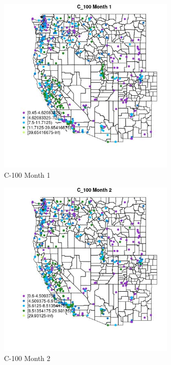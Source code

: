 \begin{figure} 
\centering  
\includegraphics[width=0.77\textwidth]{Code_Outputs/ML_input_report_ML_input_PM25_Step5_part_d_de_duplicated_aves_ML_input_MapObsMo1C_100.jpg} 
\caption{\label{fig:ML_input_report_ML_input_PM25_Step5_part_d_de_duplicated_aves_ML_inputMapObsMo1C_100}C-100 Month 1} 
\end{figure} 
 

\begin{figure} 
\centering  
\includegraphics[width=0.77\textwidth]{Code_Outputs/ML_input_report_ML_input_PM25_Step5_part_d_de_duplicated_aves_ML_input_MapObsMo2C_100.jpg} 
\caption{\label{fig:ML_input_report_ML_input_PM25_Step5_part_d_de_duplicated_aves_ML_inputMapObsMo2C_100}C-100 Month 2} 
\end{figure} 
 

